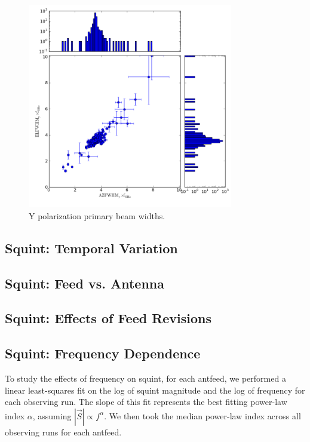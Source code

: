 \documentclass[preprint]{aastex}
\begin{document}
\begin{figure}[htb]
\begin{center}
\includegraphics[width=0.8\textwidth]{images/y_widths}
\caption{Y polarization primary beam widths. \label{fig.y_widths}}
\end{center}
\end{figure}

\subsection{Squint: Temporal Variation}\label{ss.temporal}

\subsection{Squint: Feed vs. Antenna}\label{ss.antfeed}

\subsection{Squint: Effects of Feed Revisions}\label{ss.revisions}

\subsection{Squint: Frequency Dependence}\label{ss.freq}
To study the effects of frequency on squint, for each antfeed, we
performed a linear least-squares fit on the log of squint magnitude
and the log of frequency for each observing run.  The slope of this
fit represents the best fitting power-law index $\alpha$, assuming
$|\vec{S}| \propto f^\alpha$.  We then took the median power-law index
across all observing runs for each antfeed.
\end{document}
